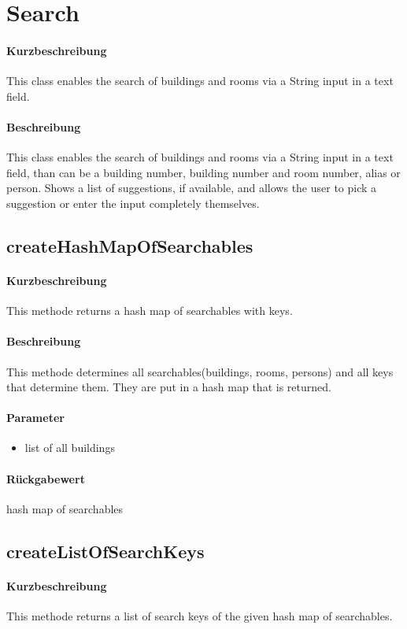 \section{Search}
\paragraph*{Kurzbeschreibung}
This class enables the search of buildings and rooms via a String input in a text field.
\paragraph*{Beschreibung}
This class enables the search of buildings and rooms via a String input in a text field, 
than can be a building number, building number and room number, alias or person.
Shows a list of suggestions, if available, and allows the user to pick a suggestion or enter the input completely themselves.

\subsection{createHashMapOfSearchables}%
\paragraph*{Kurzbeschreibung}
This methode returns a hash map of searchables with keys.
\paragraph*{Beschreibung}
This methode determines all searchables(buildings, rooms, persons) and all keys that determine them. 
They are put in a hash map that is returned.
\paragraph*{Parameter}
\begin{itemize}
    \item list of all buildings
\end{itemize}
\paragraph*{Rückgabewert}
hash map of searchables

\subsection{createListOfSearchKeys}%
\paragraph*{Kurzbeschreibung}
This methode returns a list of search keys of the given hash map of searchables.
